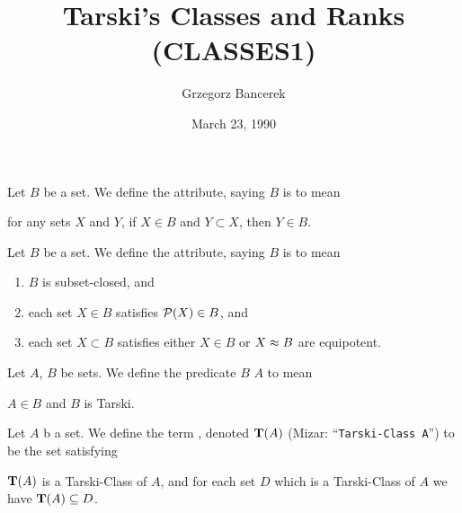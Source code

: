 \documentclass{article}
\title{Tarski's Classes and Ranks (CLASSES1)}
\author{Grzegorz Bancerek}
\date{March 23, 1990}
\begin{document}
\maketitle

\begin{definition}
Let $B$ be a set.
We define the attribute, saying $B$ is  to mean
\begin{defn}
\item for any sets $X$ and $Y$, if $X\in B$ and $Y\subset X$, then $Y\in B$.
\end{defn}
\end{definition}

\begin{definition}
Let $B$ be a set.
We define the attribute, saying $B$ is  to mean
\begin{defn}
\item \begin{enumerate}[label=(\roman*)]
\item $B$ is subset-closed, and
\item each set $X\in B$ satisfies $\mathcal{P}(X)\in B$, and
\item each set $X\subset B$ satisfies either $X\in B$ or $X\approx B$ are equipotent.
\end{enumerate}
\end{defn}
\end{definition}

\begin{definition}
Let $A$, $B$ be sets.
We define the predicate $B$  $A$ to mean
\begin{defn}
\item $A\in B$ and $B$ is Tarski.
\end{defn}
\end{definition}

\begin{definition}
Let $A$ b a set. We define the term ,
denoted $\TarskiClass{A}$ (Mizar:
``\verb#Tarski-Class A#'') to be the set satisfying
\begin{defn}
\item $\TarskiClass{A}$ is a Tarski-Class of $A$, and for each set $D$ which is a
  Tarski-Class of $A$ we have $\TarskiClass{A}\subset D$.
\end{defn}
\end{definition}
\end{document}

